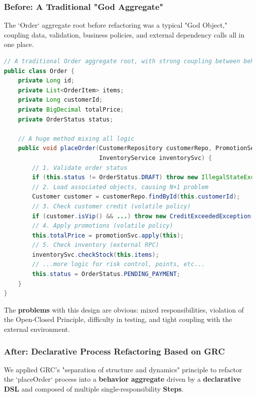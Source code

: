 \documentclass[11pt]{article}
\begin{document}
\subsubsection*{Before: A Traditional "God Aggregate"}

The `Order` aggregate root before refactoring was a typical "God Object," coupling data, validation, business policies, and external dependency calls all in one place.

\begin{lstlisting}[language=Java, caption={A traditional Order aggregate root with strong coupling}]
// A traditional Order aggregate root, with strong coupling between behavior and data
public class Order {
    private Long id;
    private List<OrderItem> items;
    private Long customerId;
    private BigDecimal totalPrice;
    private OrderStatus status;

    // A huge method mixing all logic
    public void placeOrder(CustomerRepository customerRepo, PromotionService promotionSvc, 
                           InventoryService inventorySvc) {
        // 1. Validate order status
        if (this.status != OrderStatus.DRAFT) throw new IllegalStateException(...);
        // 2. Load associated objects, causing N+1 problem
        Customer customer = customerRepo.findById(this.customerId);
        // 3. Check customer credit (volatile policy)
        if (customer.isVip() && ...) throw new CreditExceededException(...);
        // 4. Apply promotions (volatile policy)
        this.totalPrice = promotionSvc.apply(this);
        // 5. Check inventory (external RPC)
        inventorySvc.checkStock(this.items);
        // ...more logic for risk control, points, etc...
        this.status = OrderStatus.PENDING_PAYMENT;
    }
}
\end{lstlisting}
The \textbf{problems} with this design are obvious: mixed responsibilities, violation of the Open-Closed Principle, difficulty in testing, and tight coupling with the external environment.

\subsubsection*{After: Declarative Process Refactoring Based on GRC}

We applied GRC's "separation of structure and dynamics" principle to refactor the `placeOrder` process into a \textbf{behavior aggregate} driven by a \textbf{declarative DSL} and composed of multiple single-responsibility \textbf{Steps}.
\end{document}
